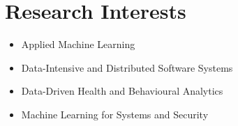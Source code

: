 \section{\textbf{Research Interests}}
\begin{itemize}[leftmargin=*,itemsep=2pt,parsep=0pt]
    \item Applied Machine Learning
    \item Data-Intensive and Distributed Software Systems
    \item Data-Driven Health and Behavioural Analytics
    \item Machine Learning for Systems and Security
\end{itemize}
